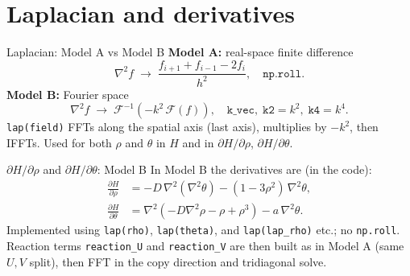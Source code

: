 \documentclass{beamer}
\begin{document}
\section{Laplacian and derivatives}
\begin{frame}{Laplacian: Model A vs Model B}
    \textbf{Model A:} real-space finite difference
    \begin{equation}
        \nabla^2 f \;\to\; \frac{f_{i+1} + f_{i-1} - 2f_i}{h^2}, \quad \texttt{np.roll}.
    \end{equation}
    \vspace{0.5em}
    \textbf{Model B:} Fourier space
    \begin{equation}
        \nabla^2 f \;\to\; \mathcal{F}^{-1}(-k^2\,\mathcal{F}(f)), \quad \texttt{k\_vec}, \; \texttt{k2} = k^2, \; \texttt{k4} = k^4.
    \end{equation}
    \texttt{lap(field)} FFTs along the spatial axis (last axis), multiplies by $-k^2$, then IFFTs. Used for both $\rho$ and $\theta$ in $H$ and in $\partial H/\partial\rho$, $\partial H/\partial\theta$.
\end{frame}

\begin{frame}{$\partial H/\partial\rho$ and $\partial H/\partial\theta$: Model B}
    In Model B the derivatives are (in the code):
    \begin{align*}
        \frac{\partial H}{\partial \rho} &= -D\,\nabla^2(\nabla^2\theta) - (1-3\rho^2)\,\nabla^2\theta, \\
        \frac{\partial H}{\partial \theta} &= \nabla^2(-D\nabla^2\rho - \rho + \rho^3) - a\,\nabla^2\theta.
    \end{align*}
    Implemented using \texttt{lap(rho)}, \texttt{lap(theta)}, and \texttt{lap(lap\_rho)} etc.; no \texttt{np.roll}. Reaction terms \texttt{reaction\_U} and \texttt{reaction\_V} are then built as in Model A (same $U,V$ split), then FFT in the copy direction and tridiagonal solve.
\end{frame}

\end{document}
